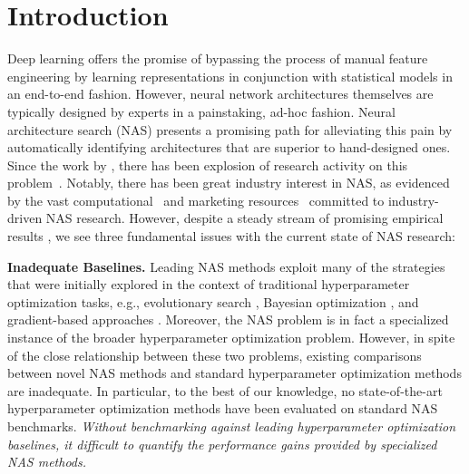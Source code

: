 \documentclass[acmlarge, nonacm]{acmart}
\begin{document}
\section{Introduction}
\label{sec:intro}
Deep learning offers the promise of bypassing the process of manual feature engineering by learning representations in conjunction with statistical models in an end-to-end fashion. However, neural network architectures themselves are typically designed by experts in a painstaking, ad-hoc fashion. Neural architecture search (NAS) presents a promising path for alleviating this pain by automatically identifying architectures that are superior to hand-designed ones. Since the 
work by \citet{nasRL}, there has been explosion of research activity on this problem~\citep{pnas2018, liu2018hierarchical, Negrinho2017,Elsken2018pareto,Real2018,bender2018understanding,Jin2018,brock2018smash,pham18ENAS,zhang2018graph,liu2018darts,xie2018snas,cai2018proxylessnas}. 
Notably, there has been great industry interest in NAS, as evidenced by the vast computational~\citep{nasRL,Zoph2018LearningTA,Real2018} and marketing resources~\citep{automl} committed to industry-driven NAS research.
However, despite a steady stream of promising empirical results \citep{nasRL,Zoph2018LearningTA, Real2018, liu2018darts, Luo2018, cai2018proxylessnas},  
we see three fundamental issues with the current state of NAS research:

    \textbf{Inadequate Baselines.} Leading NAS methods exploit many of the strategies that were initially explored in the context of traditional hyperparameter optimization tasks, e.g., evolutionary search \citep{olson2016tpot,jaderberg2017pbt}, Bayesian optimization \citep{snoek2012practical,Bergstra2011, Hutter2011}, and gradient-based approaches \citep{Bengio2000,maclaurin2015gradient}. 
    Moreover, the NAS problem is in fact a specialized instance  of the broader hyperparameter optimization problem.  However, in spite of the  close relationship between these two problems, existing comparisons between novel NAS methods and standard hyperparameter optimization methods are inadequate.  In particular, to the best of our knowledge, no state-of-the-art hyperparameter optimization methods have been evaluated on standard NAS benchmarks.  \emph{Without benchmarking against leading hyperparameter optimization baselines, it difficult to quantify the performance gains provided by specialized NAS methods.}
   
\end{document}

